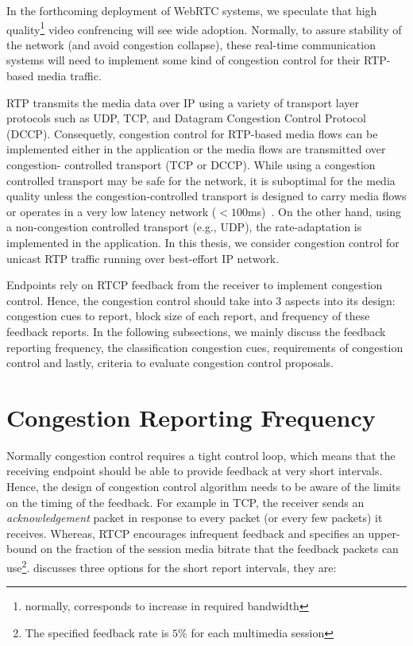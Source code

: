 In the forthcoming deployment of WebRTC systems, we speculate that high
quality\footnote{normally, corresponds to increase in required bandwidth}
video confrencing will see wide adoption. Normally, to assure stability of the
network (and avoid congestion collapse), these real-time communication systems
will need to implement some kind of congestion control for their RTP-based
media traffic.

RTP transmits the media data over IP using a variety of transport layer
protocols such as UDP, TCP, and Datagram Congestion Control Protocol (DCCP).
Consequetly, congestion control for RTP-based media flows can be implemented
either in the application or the media flows are transmitted over congestion-%
controlled transport (TCP or DCCP). While using a congestion controlled
transport may be safe for the network, it is suboptimal for the media quality
unless the congestion-controlled transport is designed to carry media flows or
operates in a very low latency network ($<100$ms)~\cite{Brosh:tcp-real-time}.
On the other hand, using a non-congestion controlled transport (e.g., UDP),
the rate-adaptation is implemented in the application.  In this thesis, we
consider congestion control for unicast RTP traffic running over best-effort
IP network.


Endpoints rely on RTCP feedback from the receiver to implement congestion
control. Hence, the congestion control should take into 3 aspects into its
design: congestion cues to report, block size of each report, and frequency of
these feedback reports. In the following subsections, we mainly discuss the
feedback reporting frequency, the classification congestion cues, requirements
of congestion control and lastly, criteria to evaluate congestion control
proposals.

\section{Congestion Reporting Frequency}
\label{fw.freq}

Normally congestion control requires a tight control loop, which means that
the receiving endpoint should be able to provide feedback at very short
intervals. Hence, the design of congestion control algorithm needs to be aware
of the limits on the timing of the feedback.  For example in TCP, the receiver
sends an \emph{acknowledgement} packet in response to every packet (or every
few packets) it receives. Whereas, RTCP encourages infrequent feedback and
specifies an upper-bound on the fraction of the session media bitrate that the
feedback packets can use\footnote{The specified feedback rate is $5\%$ for
each multimedia session}.  \cite{draft.rmcat.feedback} discusses three options
for the short report intervals, they are:

